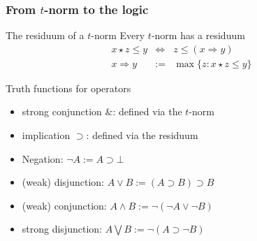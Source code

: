 \documentclass[aspectratio=169]%
  {beamer}
\newcommand\lOr{\bigvee}
\newcommand{\suchthat}{\mathrel{:}}
\newcommand{\limp}{\supset}
\begin{document}


 


\begin{frame}
  \frametitle{From $t$-norm to the logic}

  \pause
  \begin{block}{The residuum of a $t$-norm}
    Every $t$-norm has a residuum
    \begin{eqnarray*} 
      x \star z \le y &\Leftrightarrow& z \le (x\Rightarrow y)\\
      x \Rightarrow y &:=& \max \{ z \suchthat x\star z \le y \}
    \end{eqnarray*}
  \end{block}

  \pause
  \begin{block}{Truth functions for operators}
    \begin{itemize}
    \item strong conjunction $\&$: defined via the $t$-norm
    \item implication $\limp$: defined via the residuum
    \item Negation: $¬A := A \limp \bot$
    \item (weak) disjunction: $A\lor B := (A\limp B)\limp B$
    \item (weak) conjunction: $A\land B := ¬(¬A\lor¬B)$
    \item strong disjunction: $A\lOr B := ¬(A\limp¬B)$
    \end{itemize}
  \end{block}
\end{frame}
\end{document}
